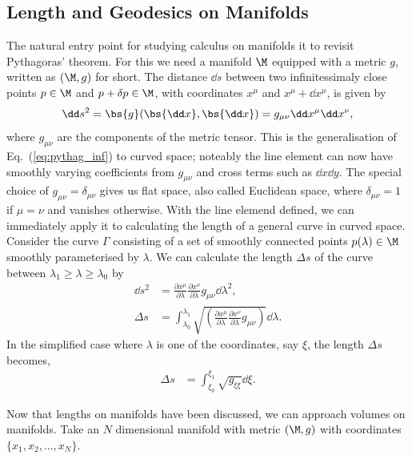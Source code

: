 \subsection{Length and Geodesics on Manifolds}\label{sect:lgm}
The natural entry point for studying calculus on manifolds it to revisit Pythagoras' theorem. For this we need a manifold $\M$ equipped with a metric $g$, written as $(\M,g)$ for short. The distance $\dd s$ between two infinitessimaly close points $p\in\M$ and $p+\delta p \in \M$, with coordinates $x^\mu$ and $x^\mu + \dd x^\mu$, is given by
\begin{equation}
\dd s^2 = \bs{g}(\bs{\dd x},\bs{\dd x}) =  g_{\mu\nu}\dd x^\mu \dd x^\nu,
\end{equation}
where $g_{\mu\nu}$ are the components of the metric tensor. This is the generalisation of Eq.~(\ref{eq:pythag_inf}) to curved space; noteably the line element can now have smoothly varying coefficients from $g_{\mu\nu}$ and cross terms such as $\dd x \dd y$. The special choice of $g_{\mu\nu} = \delta_{\mu\nu}$ gives us flat space, also called Euclidean space, where $\delta_{\mu\nu}=1$ if $\mu=\nu$ and vanishes otherwise. With the line elemend defined, we can immediately apply it to calculating the length of a general curve in curved space. Consider the curve $\Gamma$ consisting of a set of smoothly connected points $p(\lambda)\in\M$ smoothly parameterised by $\lambda$. We can calculate the length $\Delta s$ of the curve between $\lambda_1 \geq\lambda\geq\lambda_0$ by
\begin{align}
\dd s ^2 &= \frac{\partial x^\mu}{\partial \lambda}\frac{\partial x^\nu}{\partial \lambda}g_{\mu\nu}\dd \lambda^2,\\
\label{eq:Delta_s}\Delta s &= \int_{\lambda_0}^{\lambda_1}\sqrt{\left(\frac{\partial x^\mu}{\partial \lambda}\frac{\partial x^\nu}{\partial \lambda}g_{\mu\nu}\right)}\dd \lambda.
\end{align}
In the simplified case where $\lambda$ is one of the coordinates, say $\xi$, the length $\Delta s$ becomes,
\begin{align} \label{eq:coord_interval_length}
\Delta s &= \int_{\xi_0}^{\xi_1}\sqrt{g_{\xi\xi}}\dd \xi.
\end{align}

Now that lengths on manifolds have been discussed, we can approach volumes on manifolds. Take an $N$ dimensional manifold with metric $(\M,g)$ with coordinates $\{x_1,x_2,...,x_N\}$.

